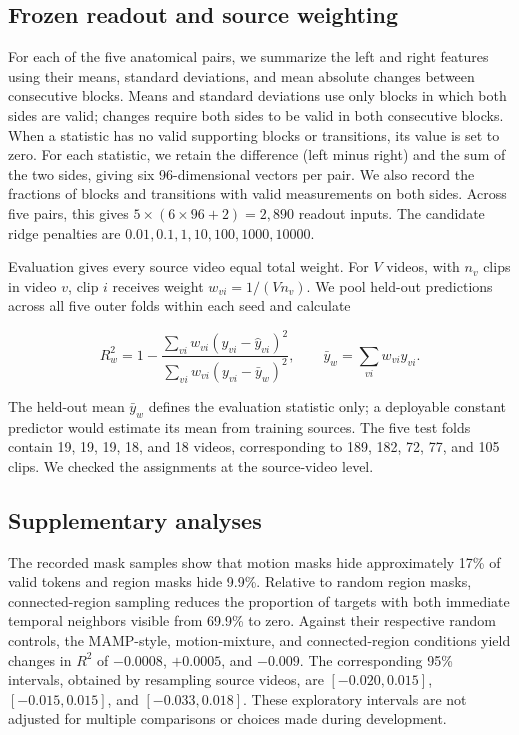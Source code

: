 \documentclass{article}
\begin{document}
\clearpage
\subsection{Frozen readout and source
weighting}\label{frozen-readout-and-source-weighting}

For each of the five anatomical pairs, we summarize the left and right
features using their means, standard deviations, and mean absolute
changes between consecutive blocks. Means and standard deviations use
only blocks in which both sides are valid; changes require both sides to
be valid in both consecutive blocks. When a statistic has no valid
supporting blocks or transitions, its value is set to zero. For each
statistic, we retain the difference (left minus right) and the sum of
the two sides, giving six 96-dimensional vectors per pair. We also
record the fractions of blocks and transitions with valid measurements
on both sides. Across five pairs, this gives
\(5\times(6\times96+2)=2{,}890\) readout inputs. The candidate ridge
penalties are \(0.01,0.1,1,10,100,1000,10000\).

Evaluation gives every source video equal total weight. For \(V\)
videos, with \(n_v\) clips in video \(v\), clip \(i\) receives weight
\(w_{vi}=1/(Vn_v)\). We pool held-out predictions across all five outer
folds within each seed and calculate

\[R_w^2=1-\frac{\sum_{vi}w_{vi}(y_{vi}-\hat y_{vi})^2}{\sum_{vi}w_{vi}(y_{vi}-\bar y_w)^2},\qquad \bar y_w=\sum_{vi}w_{vi}y_{vi}.\]

The held-out mean \(\bar y_w\) defines the evaluation statistic only; a
deployable constant predictor would estimate its mean from training
sources. The five test folds contain 19, 19, 19, 18, and 18 videos,
corresponding to 189, 182, 72, 77, and 105 clips. We checked the
assignments at the source-video level.

\subsection{Supplementary analyses}\label{supplementary-analyses}

The recorded mask samples show that motion masks hide approximately 17\%
of valid tokens and region masks hide 9.9\%. Relative to random region
masks, connected-region sampling reduces the proportion of targets with
both immediate temporal neighbors visible from 69.9\% to zero. Against
their respective random controls, the MAMP-style, motion-mixture, and
connected-region conditions yield changes in \(R^2\) of \(-0.0008\),
\(+0.0005\), and \(-0.009\). The corresponding 95\% intervals, obtained
by resampling source videos, are \([-0.020,0.015]\), \([-0.015,0.015]\),
and \([-0.033,0.018]\). These exploratory intervals are not adjusted for
multiple comparisons or choices made during development.
\end{document}
